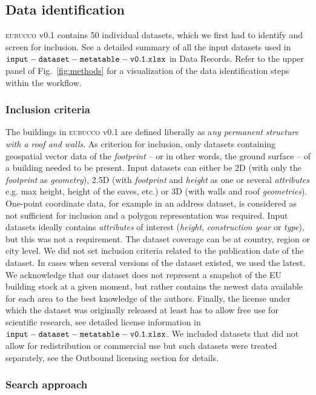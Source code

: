 \documentclass[fleqn,10pt]{wlscirep}
\begin{document}
\subsection*{Data identification}

\textsc{eubucco} v0.1 contains 50 individual datasets, which we first had to identify and screen for inclusion. See a detailed summary of all the input datasets used in ${\tt input-dataset-metatable-v0.1.xlsx}$ in Data Records. Refer to the upper panel of Fig.~\ref{fig:methods} for a visualization of the data identification steps within the workflow.

\subsubsection*{Inclusion criteria}

The buildings in \textsc{eubucco} v0.1 are defined liberally as a\textit{ny permanent structure with a roof and walls}. 
As criterion for inclusion, only datasets containing geospatial vector data of the \textit{footprint} -- or in other words, the ground surface -- of a building needed to be present. 
Input datasets can either be 2D (with only the \textit{footprint} as \textit{geometry}), 2.5D (with \textit{footprint} and \textit{height} as one or several \textit{attributes} e.g. max height, height of the eaves, etc.) or 3D (with walls and roof \textit{geometries}). One-point coordinate data, for example in an address dataset, is considered as not sufficient for inclusion and a polygon representation was required.
Input datasets ideally contains \textit{attributes} of interest (\textit{height}, \textit{construction year} or \textit{type}), but this was not a requirement.
The dataset coverage can be at country, region or city level. 
We did not set inclusion criteria related to the publication date of the dataset. In cases when several versions of the dataset existed, we used the latest. We acknowledge that our dataset does not represent a snapshot of the EU building stock at a given moment, but rather contains the newest data available for each area to the best knowledge of the authors.
Finally, the license under which the dataset was originally released at least has to allow free use for scientific research, see detailed license information in ${\tt input-dataset-metatable-v0.1.xlsx}$. We included datasets that did not allow for redistribution or commercial use but such datasets were treated separately, see the Outbound licensing section for details.

\subsubsection*{Search approach}
\end{document}
